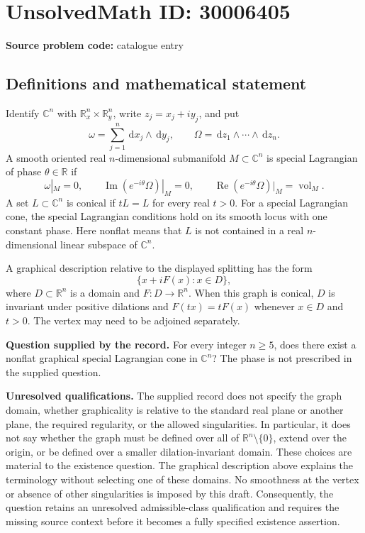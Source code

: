 \documentclass[11pt]{article}
\newcommand{\R}{\mathbb{R}}
\newcommand{\C}{\mathbb{C}}
\newcommand{\dd}{\,\mathrm{d}}
\begin{document}
\section*{UnsolvedMath ID: 30006405}
\textbf{Source problem code:} catalogue entry
\subsection{Definitions and mathematical statement}
Identify \(\C^n\) with \(\R_x^n\times\R_y^n\), write \(z_j=x_j+iy_j\), and put
\[
\omega=\sum_{j=1}^n\dd x_j\wedge\dd y_j,
\qquad \Omega=\dd z_1\wedge\cdots\wedge\dd z_n.
\]
A smooth oriented real \(n\)-dimensional submanifold \(M\subset\C^n\) is special Lagrangian of phase \(\theta\in\R\) if
\[
\omega|_M=0,\qquad
\operatorname{Im}(e^{-i\theta}\Omega)|_M=0,\qquad
\operatorname{Re}(e^{-i\theta}\Omega)|_M=\operatorname{vol}_M.
\]
A set \(L\subset\C^n\) is conical if \(tL=L\) for every real \(t>0\). For a special Lagrangian cone, the special Lagrangian conditions hold on its smooth locus with one constant phase. Here nonflat means that \(L\) is not contained in a real \(n\)-dimensional linear subspace of \(\C^n\).

A graphical description relative to the displayed splitting has the form
\[
\{x+iF(x):x\in D\},
\]
where \(D\subset\R^n\) is a domain and \(F:D\to\R^n\). When this graph is conical, \(D\) is invariant under positive dilations and \(F(tx)=tF(x)\) whenever \(x\in D\) and \(t>0\). The vertex may need to be adjoined separately.

\textbf{Question supplied by the record.} For every integer \(n\geq5\), does there exist a nonflat graphical special Lagrangian cone in \(\C^n\)? The phase is not prescribed in the supplied question.

\textbf{Unresolved qualifications.} The supplied record does not specify the graph domain, whether graphicality is relative to the standard real plane or another plane, the required regularity, or the allowed singularities. In particular, it does not say whether the graph must be defined over all of \(\R^n\setminus\{0\}\), extend over the origin, or be defined over a smaller dilation-invariant domain. These choices are material to the existence question. The graphical description above explains the terminology without selecting one of these domains. No smoothness at the vertex or absence of other singularities is imposed by this draft. Consequently, the question retains an unresolved admissible-class qualification and requires the missing source context before it becomes a fully specified existence assertion.
\end{document}
